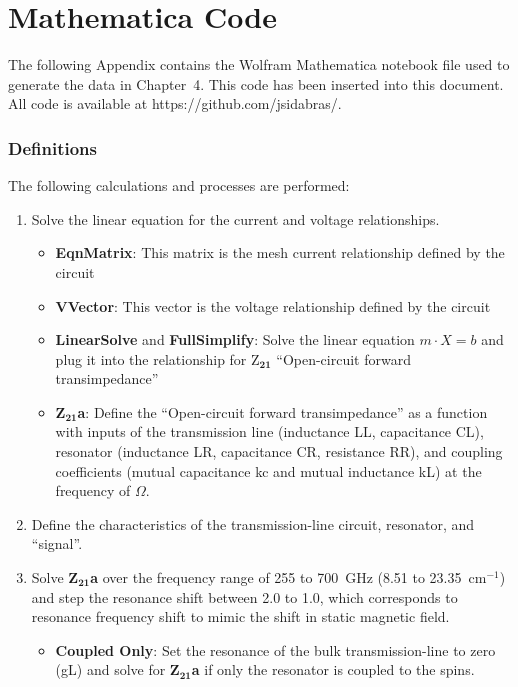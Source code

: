 \chapter[Mathematica Code]{Mathematica Code}

The following Appendix contains the Wolfram Mathematica notebook file used to generate the data in Chapter~4. This code has been inserted into this document. All code is available at https://github.com/jsidabras/.

\subsection*{Definitions}

The following calculations and processes are performed:

\begin{enumerate}
    \item Solve the linear equation for the current and voltage relationships.
    \begin{itemize}
        \item \textbf{EqnMatrix}: This matrix is the mesh current relationship defined by the circuit
        \item \textbf{VVector}: This vector is the voltage relationship defined by the circuit
        \item \textbf{LinearSolve} and \textbf{FullSimplify}: Solve the linear equation $m\cdot X=b$ and plug it into the relationship for Z$_{\mathbf{21}}$ ``Open-circuit forward transimpedance''
        \item \textbf{Z$_{\mathbf{21}}$a}: Define the ``Open-circuit forward transimpedance'' as a function with inputs of the transmission line (inductance LL, capacitance CL), resonator (inductance LR, capacitance CR, resistance RR), and coupling coefficients (mutual capacitance kc and mutual inductance kL) at the frequency of $\Omega$.
    \end{itemize}
    \item Define the characteristics of the transmission-line circuit, resonator, and ``signal''.
    \item Solve \textbf{Z$_{\mathbf{21}}$a} over the frequency range of 255 to 700~GHz (8.51 to 23.35~cm$^{-1}$) and step the resonance shift between 2.0 to 1.0, which corresponds to resonance frequency shift to mimic the shift in static magnetic field.
    \begin{itemize}
        \item \textbf{Coupled Only}: Set the resonance of the bulk transmission-line to zero (gL) and solve for \textbf{Z$_{\mathbf{21}}$a} if only the resonator is coupled to the spins.

\end{itemize}
\end{enumerate}
